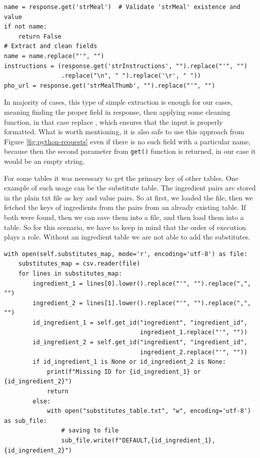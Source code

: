 {
\begin{verbatim}
name = response.get('strMeal')  # Validate 'strMeal' existence and value
if not name:
    return False
# Extract and clean fields
name = name.replace("'", "")
instructions = (response.get('strInstructions', "").replace("'", "")
                .replace("\n", " ").replace('\r', " "))
pho_url = response.get('strMealThumb', "").replace("'", "")
\end{verbatim}
\label{fig:python-requests}
}
In majority of cases, this type of simple extraction is enough for our cases, meaning finding the proper field in response, then applying some cleaning function, in that case replace \cite{python-replace}, which ensures that the input is properly formatted. What is worth mentioning, it is also safe to use this approach from Figure \ref{fig:python-requests} even if there is no such field with a particular name, because then the second parameter from \texttt{get()}  function is returned, in our case it would be an empty string.
\par
For some tables it was necessary to get the primary key of other tables. One example of such usage can be the substitute table. The ingredient pairs are stored in the plain txt file as key and value pairs. So at first, we loaded the file, then we fetched the keys of ingredients from the pairs from an already existing table. If both were found, then we can save them into a file, and then load them into a table. So for this scenario, we have to keep in mind that the order of execution plays a role. Without an ingredient table we are not able to add the substitutes.
{
\begin{verbatim}
with open(self.substitutes_map, mode='r', encoding='utf-8') as file:
    substitutes_map = csv.reader(file)
    for lines in substitutes_map:
        ingredient_1 = lines[0].lower().replace("'", "").replace(",", "")
        ingredient_2 = lines[1].lower().replace("'", "").replace(",", "")
        id_ingredient_1 = self.get_id("ingredient", "ingredient_id",
                                      ingredient_1.replace("'", ""))
        id_ingredient_2 = self.get_id("ingredient", "ingredient_id",
                                      ingredient_2.replace("'", ""))
        if id_ingredient_1 is None or id_ingredient_2 is None:
            print(f"Missing ID for {id_ingredient_1} or {id_ingredient_2}")
            return
        else:
            with open("substitutes_table.txt", "w", encoding='utf-8') as sub_file:
                # saving to file
                sub_file.write(f"DEFAULT,{id_ingredient_1},{id_ingredient_2}")
\end{verbatim}
\label{fig:Mapping ingredients from external file}
}
